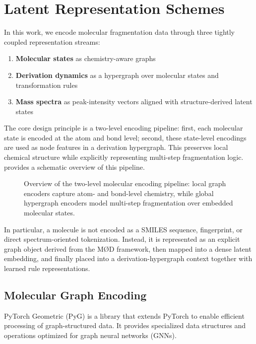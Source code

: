 \section{Latent Representation Schemes}

In this work, we encode molecular fragmentation data through three tightly coupled representation streams:

\begin{enumerate}
    \item \textbf{Molecular states} as chemistry-aware graphs
    \item \textbf{Derivation dynamics} as a hypergraph over molecular states and transformation rules
    \item \textbf{Mass spectra} as peak-intensity vectors aligned with structure-derived latent states
\end{enumerate}

The core design principle is a two-level encoding pipeline:
first, each molecular state is encoded at the atom and bond level;
second, these state-level encodings are used as node features in a derivation hypergraph.
This preserves local chemical structure while explicitly representing multi-step fragmentation logic.
 provides a schematic overview of this pipeline.

\begin{figure}[H]
    \centering
    \resizebox{0.9\textwidth}{!}{
        
    }
    \caption[Overview of the Two-Level Representation]{
        Overview of the two-level molecular encoding pipeline: local graph encoders capture atom- and bond-level chemistry, while global hypergraph encoders model multi-step fragmentation over embedded molecular states.
    }
    \label{fig:2-level-overview}
\end{figure}

In particular, a molecule is not encoded as a SMILES sequence, fingerprint, or direct spectrum-oriented tokenization.
Instead, it is represented as an explicit graph object derived from the M\O D framework, then mapped into a dense latent embedding, and finally placed into a derivation-hypergraph context together with learned rule representations.

\subsection{Molecular Graph Encoding}
\label{sec:molgraph-encoding}

PyTorch Geometric (PyG) \cite{Fey2025} is a library that extends PyTorch to enable efficient processing of graph-structured data.
It provides specialized data structures and operations optimized for graph neural networks (GNNs).

